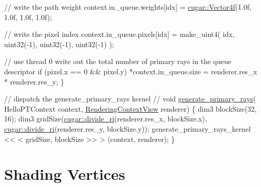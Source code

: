 \begin{DoxyParagraph}{}
\begin{DoxyCodeInclude}
    \textcolor{comment}{// write the path weight}
    context.in\_queue.weights[idx] = \hyperlink{structcugar_1_1_vector}{cugar::Vector4f}(1.0f, 1.0f, 1.0f, 1.0f);

    \textcolor{comment}{// write the pixel index}
    context.in\_queue.pixels[idx] = make\_uint4( idx, uint32(-1), uint32(-1), uint32(-1) );

    \textcolor{comment}{// use thread 0 write out the total number of primary rays in the queue descriptor}
    \textcolor{keywordflow}{if} (pixel.x == 0 && pixel.y)
        *context.in\_queue.size = renderer.res\_x * renderer.res\_y;
\}

\textcolor{comment}{// dispatch the generate\_primary\_rays kernel}
\textcolor{comment}{//}
\textcolor{keywordtype}{void} \hyperlink{group___p_t_lib_ga66602a846711dc021ed0b930846ea596}{generate\_primary\_rays}(
    HelloPTContext          context,
    \hyperlink{struct_rendering_context_view}{RenderingContextView}    renderer)
\{
    dim3 blockSize(32, 16);
    dim3 gridSize(\hyperlink{group___basic_utils_gabb6714186dbbd864f0a9298944ba509b}{cugar::divide\_ri}(renderer.res\_x, blockSize.x), 
      \hyperlink{group___basic_utils_gabb6714186dbbd864f0a9298944ba509b}{cugar::divide\_ri}(renderer.res\_y, blockSize.y));
    generate\_primary\_rays\_kernel << < gridSize, blockSize >> > (context, renderer);
\}
\end{DoxyCodeInclude}
 
\end{DoxyParagraph}
\hypertarget{_hello_renderer_page_HelloPTShadingVerticesSection}{}\section{Shading Vertices}\label{_hello_renderer_page_HelloPTShadingVerticesSection}
